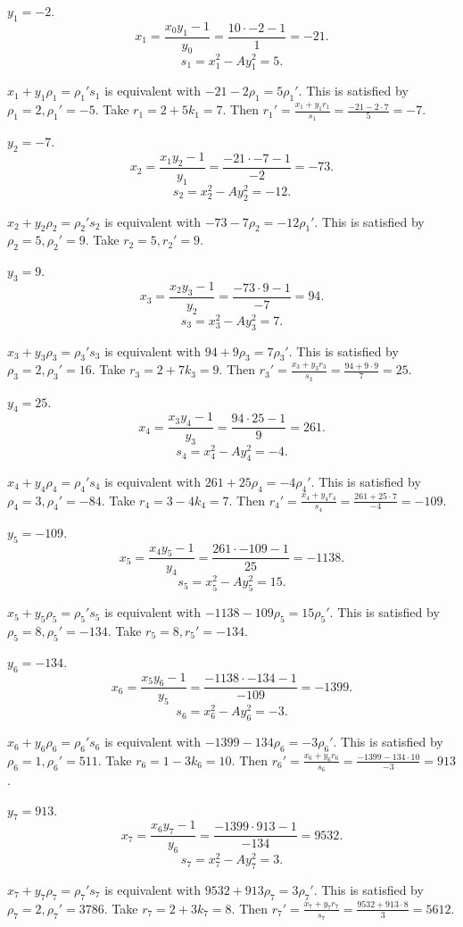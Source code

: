 \documentclass{article}
\theoremstyle{definition}
\theoremstyle{definition}
\begin{document}
$y_1=-2$.
\[
x_1 = \frac{x_0y_1-1}{y_0} = \frac{10 \cdot -2 - 1}{1} = -21.
\]
\[
s_1 = x_1^2 - Ay_1^2 = 5.
\]

$x_1+y_1\rho_1=\rho_1's_1$ is equivalent with
$-21-2\rho_1=5\rho_1'$. This is satisfied by
$\rho_1=2, \rho_1'=-5$.
Take $r_1 = 2 +5k_1 = 7$. 
Then $r_1' = \frac{x_1+y_1r_1}{s_1}
=\frac{-21 - 2 \cdot 7}{5} = -7$.

$y_2=-7$.
\[
x_2 = \frac{x_1y_2-1}{y_1} = \frac{-21 \cdot -7 - 1}{-2} = -73.
\]
\[
s_2 = x_2^2 - Ay_2^2 = -12.
\]

$x_2+y_2\rho_2=\rho_2's_2$ is equivalent with
$-73-7\rho_2=-12\rho_1'$. This is satisfied by
$\rho_2=5, \rho_2'=9$.
Take $r_2=5, r_2'=9$.

$y_3=9$.
\[
x_3 = \frac{x_2y_3-1}{y_2} = \frac{-73 \cdot 9 - 1}{-7} = 94.
\]
\[
s_3 = x_3^2 - Ay_3^2 = 7.
\]

$x_3+y_3\rho_3=\rho_3's_3$ is equivalent with
$94+9\rho_3=7\rho_3'$. This is satisfied by
$\rho_3=2, \rho_3'=16$.
Take $r_3=2+7k_3=9$.
Then $r_3'=\frac{x_3+y_3r_3}{s_3}
=\frac{94+9\cdot 9}{7} = 25$.

$y_4=25$.
\[
x_4 = \frac{x_3y_4-1}{y_3} = \frac{94\cdot 25-1}{9} = 261.
\]
\[
s_4 = x_4^2 - Ay_4^2 = -4.
\]

$x_4+y_4\rho_4=\rho_4's_4$ is equivalent with
$261+25\rho_4=-4\rho_4'$. This is satisfied by
$\rho_4=3, \rho_4'=-84$.
Take $r_4=3-4k_4=7$. 
Then $r_4' = \frac{x_4+y_4r_4}{s_4} =
\frac{261+25 \cdot 7}{-4}=-109$.

$y_5=-109$.
\[
x_5 = \frac{x_4y_5-1}{y_4} = \frac{261 \cdot -109-1}{25} = -1138.
\]
\[
s_5 = x_5^2 - Ay_5^2 = 15.
\]

$x_5+y_5\rho_5=\rho_5's_5$ is equivalent with
$-1138-109\rho_5=15\rho_5'$. This is satisfied by
$\rho_5=8, \rho_5'=-134$.
Take $r_5=8, r_5'=-134$.

$y_6=-134$.
\[
x_6 = \frac{x_5y_6-1}{y_5} = \frac{-1138 \cdot -134 - 1}{-109} = -1399.
\]
\[
s_6 = x_6^2 - Ay_6^2 = -3.
\]

$x_6+y_6\rho_6=\rho_6's_6$ is equivalent with
$-1399-134\rho_6=-3\rho_6'$. This is satisfied by
$\rho_6=1, \rho_6'=511$.
Take $r_6=1-3k_6 = 10$.
Then $r_6'=\frac{x_6+y_6r_6}{s_6}
=\frac{-1399 -134 \cdot 10}{-3}
=913$.

$y_7=913$.
\[
x_7 = \frac{x_6y_7-1}{y_6} = \frac{-1399 \cdot 913-1}{-134} = 9532.
\]
\[
s_7 = x_7^2 - Ay_7^2 = 3.
\]

$x_7+y_7\rho_7=\rho_7's_7$ is equivalent with
$9532+913\rho_7=3\rho_7'$. This is satisfied by
$\rho_7=2, \rho_7'=3786$.
Take $r_7=2+3k_7 = 8$.
Then $r_7'=\frac{x_7+y_7r_7}{s_7}
=\frac{9532 + 913 \cdot 8}{3}
=5612$.
\end{document}
